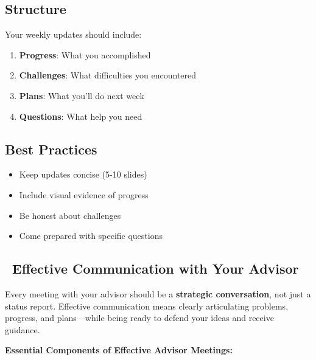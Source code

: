 \documentclass[11pt,a4paper]{article}
\begin{document}
\subsection{Structure}
Your weekly updates should include:
\begin{enumerate}
    \item \textbf{Progress}: What you accomplished
    \item \textbf{Challenges}: What difficulties you encountered
    \item \textbf{Plans}: What you'll do next week
    \item \textbf{Questions}: What help you need
\end{enumerate}

\subsection{Best Practices}
\begin{itemize}
    \item Keep updates concise (5-10 slides)
    \item Include visual evidence of progress
    \item Be honest about challenges
    \item Come prepared with specific questions
\end{itemize}

\subsection{\faCommentDots~Effective Communication with Your Advisor}

\begin{tcolorbox}[colback=green!5,colframe=green!50,title={\faLightbulb~The Foundation of Productive Meetings}]
Every meeting with your advisor should be a \textbf{strategic conversation}, not just a status report. Effective communication means clearly articulating problems, progress, and plans—while being ready to defend your ideas and receive guidance.
\end{tcolorbox}

\textbf{Essential Components of Effective Advisor Meetings:}
\end{document}
